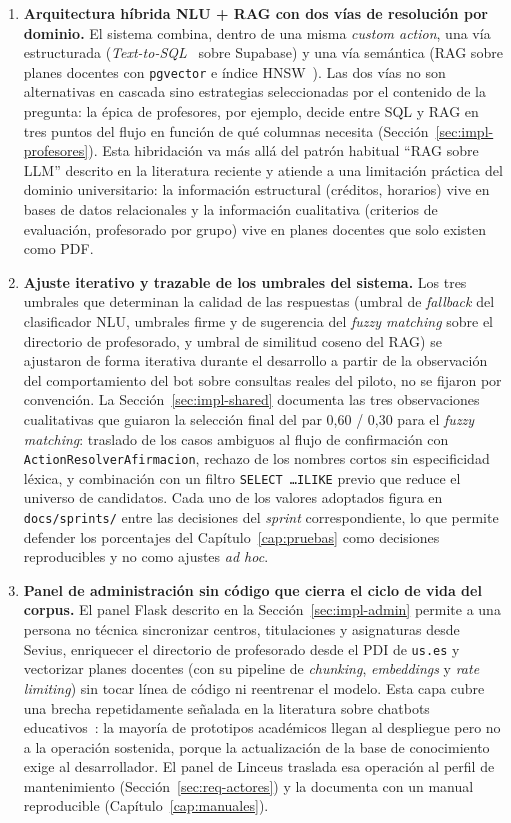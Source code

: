 \begin{enumerate}
    \item \textbf{Arquitectura híbrida NLU + RAG con dos vías de resolución por dominio.} El sistema combina, dentro de una misma \textit{custom action}, una vía estructurada (\textit{Text-to-SQL}~\cite{yu2018spider} sobre Supabase) y una vía semántica (RAG sobre planes docentes con \texttt{pgvector} e índice HNSW~\cite{malkov2018hnsw}). Las dos vías no son alternativas en cascada sino estrategias seleccionadas por el contenido de la pregunta: la épica de profesores, por ejemplo, decide entre SQL y RAG en tres puntos del flujo en función de qué columnas necesita (Sección~\ref{sec:impl-profesores}). Esta hibridación va más allá del patrón habitual ``RAG sobre LLM'' descrito en la literatura reciente y atiende a una limitación práctica del dominio universitario: la información estructural (créditos, horarios) vive en bases de datos relacionales y la información cualitativa (criterios de evaluación, profesorado por grupo) vive en planes docentes que solo existen como PDF.
    \item \textbf{Ajuste iterativo y trazable de los umbrales del sistema.} Los tres umbrales que determinan la calidad de las respuestas (umbral de \textit{fallback} del clasificador NLU, umbrales firme y de sugerencia del \textit{fuzzy matching} sobre el directorio de profesorado, y umbral de similitud coseno del RAG) se ajustaron de forma iterativa durante el desarrollo a partir de la observación del comportamiento del bot sobre consultas reales del piloto, no se fijaron por convención. La Sección~\ref{sec:impl-shared} documenta las tres observaciones cualitativas que guiaron la selección final del par 0,60 / 0,30 para el \textit{fuzzy matching}: traslado de los casos ambiguos al flujo de confirmación con \texttt{ActionResolverAfirmacion}, rechazo de los nombres cortos sin especificidad léxica, y combinación con un filtro \texttt{SELECT \ldots ILIKE} previo que reduce el universo de candidatos. Cada uno de los valores adoptados figura en \texttt{docs/sprints/} entre las decisiones del \textit{sprint} correspondiente, lo que permite defender los porcentajes del Capítulo~\ref{cap:pruebas} como decisiones reproducibles y no como ajustes \textit{ad hoc}.
    \item \textbf{Panel de administración sin código que cierra el ciclo de vida del corpus.} El panel Flask descrito en la Sección~\ref{sec:impl-admin} permite a una persona no técnica sincronizar centros, titulaciones y asignaturas desde Sevius, enriquecer el directorio de profesorado desde el PDI de \texttt{us.es} y vectorizar planes docentes (con su pipeline de \textit{chunking}, \textit{embeddings} y \textit{rate limiting}) sin tocar línea de código ni reentrenar el modelo. Esta capa cubre una brecha repetidamente señalada en la literatura sobre chatbots educativos~\cite{wollny2021survey}: la mayoría de prototipos académicos llegan al despliegue pero no a la operación sostenida, porque la actualización de la base de conocimiento exige al desarrollador. El panel de Linceus traslada esa operación al perfil de mantenimiento (Sección~\ref{sec:req-actores}) y la documenta con un manual reproducible (Capítulo~\ref{cap:manuales}).
\end{enumerate}

